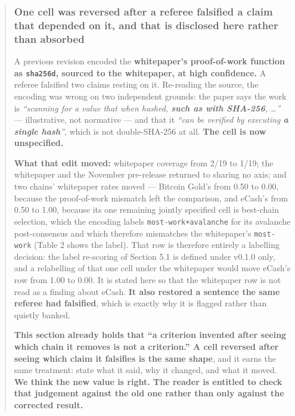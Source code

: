\documentclass[
]{article}
\begin{document}
\begin{quote}
\mbox{}%
\subsubsection{One cell was reversed after a referee falsified a claim
that depended on it, and that is disclosed here rather than
absorbed}\label{one-cell-was-reversed-after-a-referee-falsified-a-claim-that-depended-on-it-and-that-is-disclosed-here-rather-than-absorbed}

A previous revision encoded the \textbf{whitepaper's proof-of-work
function as \texttt{sha256d}, sourced to the whitepaper, at high
confidence.} A referee falsified two claims resting on it. Re-reading
the source, the encoding was wrong on two independent grounds: the paper
says the work is \emph{``scanning for a value that when hashed,
\textbf{such as with SHA-256}, \ldots{}''} --- illustrative, not
normative --- and that it \emph{``can be verified by executing \textbf{a
single hash}''}, which is not double-SHA-256 at all. \textbf{The cell is
now unspecified.}

\textbf{What that edit moved:} whitepaper coverage from 2/19 to 1/19;
the whitepaper and the November pre-release returned to sharing no axis;
and two chains' whitepaper rates moved --- Bitcoin Gold's from 0.50 to
0.00, because the proof-of-work mismatch left the comparison, and
eCash's from 0.50 to 1.00, because its one remaining jointly specified
cell is best-chain selection, which the encoding labels
\texttt{most-work+avalanche} for its avalanche post-consensus and which
therefore mismatches the whitepaper's \texttt{most-work} (Table 2 shows
the label). That row is therefore entirely a labelling decision: the
label re-scoring of Section 5.1 is defined under v0.1.0 only, and a
relabelling of that one cell under the whitepaper would move eCash's row
from 1.00 to 0.00. It is stated here so that the whitepaper row is not
read as a finding about eCash. \textbf{It also restored a sentence the
same referee had falsified}, which is exactly why it is flagged rather
than quietly banked.

\textbf{This section already holds that ``a criterion invented after
seeing which chain it removes is not a criterion.'' A cell reversed
after seeing which claim it falsifies is the same shape}, and it earns
the same treatment: state what it said, why it changed, and what it
moved. \textbf{We think the new value is right. The reader is entitled
to check that judgement against the old one rather than only against the
corrected result.}
\end{quote}
\end{document}

